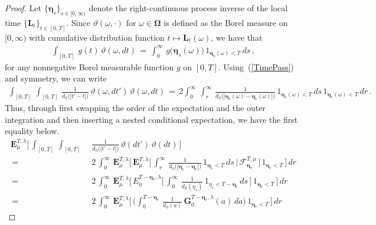 \documentclass[10pt]{article}
\numberwithin{equation}{section}
\theoremstyle{definition}
\begin{document}
\begin{proof} Let $\{\boldsymbol{\eta}_s \}_{s\in [0,\infty)}$ denote the right-continuous process inverse of the local time  $\{ \mathbf{L}_t  \}_{t\in [0,T]}$.  Since $\vartheta(\omega,  \cdot )$ for $\omega \in \boldsymbol{\Omega}$ is defined as the Borel measure on $[0,\infty)$ with cumulative distribution function $t\mapsto \mathbf{L}_t(\omega)$, we have that
\begin{align} \label{TimePass}
\int_{[0,T]}\,g(t)\, \vartheta(\omega, dt)\,=\, \int_0^{\infty}\,g\big(\boldsymbol{\eta}_s(\omega)\big) \, 1_{\boldsymbol{\eta}_s(\omega)< T }\,ds \,, 
\end{align}
 for any nonnegative Borel measurable function $g$ on $[0,T]$.  Using~(\ref{TimePass}) and symmetry, we can write
\begin{align*}
\int_{[0,T]}\,\int_{ [0,T] }\,\frac{1}{d_{h}\big(|t'-t|\big)} \,\vartheta(\omega, dt')\,\vartheta(\omega, dt)   \,=\, 2\int_{0}^{\infty}\,\int_{r}^{\infty} \,\frac{1}{d_{h}\big(|\boldsymbol{\eta}_{s}(\omega)-\boldsymbol{\eta}_r(\omega)|\big)} \,1_{\boldsymbol{\eta}_{s}(\omega) < T }\, ds\,1_{\boldsymbol{\eta}_r(\omega)  < T }\,dr\, .
\end{align*}
 Thus, through first swapping the order of the expectation and the outer integration and then inserting a nested conditional expectation, we have the first equality below.
\begin{align}\label{EnergyCalculation}
\mathbf{E}_{\mu}^{T,\lambda}\bigg[\, \int_{[0,T]}\,\int_{ [0,T] }\,&\,\frac{1}{d_{h}\big(|t'-t|\big)} \,\vartheta(dt')\,\vartheta(dt) \, \bigg]  \nonumber  \\
\,=\,&\, 2\, \int_{0}^{\infty}\,\mathbf{E}_{\mu}^{T,\lambda}\bigg[ \,\mathbf{E}_{\mu}^{T,\lambda}\bigg[\,  \int_{r}^{\infty}\, \frac{1}{d_{h}\big(|\boldsymbol{\eta}_{s}-\boldsymbol{\eta}_r|\big)} \, 1_{\boldsymbol{\eta}_{s} < T }\,ds\,\bigg|\,\mathscr{F}_{\boldsymbol{\eta}_r}^{T,\mu} \,\bigg] \,  1_{\boldsymbol{\eta}_r < T } \, \bigg] \,dr   \nonumber
\\
\,=\,&\, 2 \,\int_{0}^{\infty}\,\mathbf{E}_{\mu}^{T,\lambda}\bigg[ \,E^{T-\boldsymbol{\eta}_r ,\lambda}_{0}\bigg[  \,\int_{0}^{\infty}\, \frac{1}{d_{h}(\eta_{s})}\,  1_{ \eta_{s} < T-\boldsymbol{\eta}_r  }\,ds\,\bigg]  \, 1_{\boldsymbol{\eta}_r < T  }\,\bigg]\, dr   \nonumber
 \\
\,=\,&\, 2\, \int_{0}^{\infty}\,\mathbf{E}_{\mu}^{T,\lambda}\bigg[ \,\bigg(\int_{0}^{T-\boldsymbol{\eta}_r}\,\frac{1}{d_{h}(a)} \,\mathbf{G}^{T-\boldsymbol{\eta}_r , \lambda }_0(a)\, da\bigg)\, 1_{\boldsymbol{\eta}_r < T } \,\bigg] \, dr

\end{align}
\end{proof}
\end{document}
